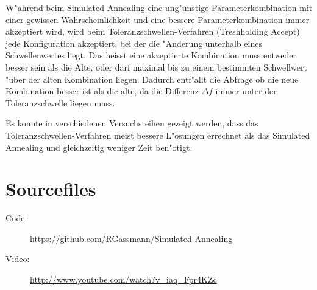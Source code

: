 W"ahrend beim Simulated Annealing eine ung"unstige
Parameterkombination mit einer gewissen Wahrscheinlichkeit und
eine bessere Parameterkombination immer akzeptiert wird, wird beim
Toleranzschwellen-Verfahren (Treshholding Accept) jede Konfiguration
akzeptiert, bei der die "Anderung unterhalb eines Schwellenwertes
liegt. Das heisst eine akzeptierte Kombination muss entweder besser
sein als die Alte, oder darf maximal bis zu einem bestimmten Schwellwert
"uber der alten Kombination liegen. Dadurch entf"allt die Abfrage ob die
neue Kombination besser ist als die alte, da die Differenz $\Delta f$
immer unter der Toleranzschwelle liegen muss.

Es konnte in verschiedenen Versuchsreihen gezeigt werden, dass das
Toleranz\-schwellen-Verfahren meist bessere L"osungen errechnet als das
Simulated Annealing und gleichzeitig weniger Zeit ben"otigt.

\section{Sourcefiles}
\begin{description}
	\item [Code:] \url{https://github.com/RGassmann/Simulated-Annealing}
	\item [Video:] \url{http://www.youtube.com/watch?v=iaq_Fpr4KZc}
\end{description}
